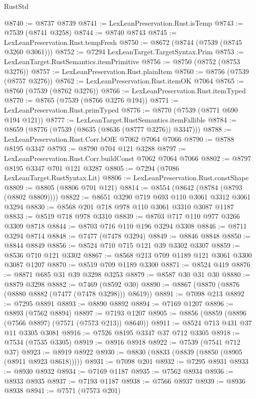 \begin{lexlean}{RustStd}
\begin{coremodule}
@8740 := @8737 @8739
@8741 := LexLeanPreservation.Rust.isTemp
@8743 := @7539 (@8741 @3258)
@8744 := @8740 @8743
@8745 := LexLeanPreservation.Rust.tempFresh
@8750 := @8672 (@8744 (@7539 (@8745 @3260 @3061)))
@8752 := @7294 LexLeanTarget.TargetSyntax.Prim
@8753 := LexLeanTarget.RustSemantics.itemPrimitive
@8756 := @8750 (@8752 (@8753 @3276))
@8757 := LexLeanPreservation.Rust.plainItem
@8760 := @8756 (@7539 (@8757 @3276))
@8762 := LexLeanPreservation.Rust.itemOK @7064
@8765 := @8760 (@7539 (@8762 @3276))
@8766 := LexLeanPreservation.Rust.itemTyped
@8770 := @8765 (@7539 (@8766 @3276 @194))
@8771 := LexLeanPreservation.Rust.primTyped
@8776 := @8770 (@7539 (@8771 @690 @194 @121))
@8777 := LexLeanTarget.RustSemantics.itemFallible
@8784 := @8659 (@8776 (@7539 (@8635 (@8636 (@8777 @3276)) @3347)))
@8788 := LexLeanPreservation.Rust.Corr.bOfE @7062 @7064 @7066
@8790 := @8788 @8195 @3347
@8793 := @8790 @704 @121 @3288
@8797 := LexLeanPreservation.Rust.Corr.buildConst @7062 @7064 @7066
@8802 := @8797 @8195 @3347 @701 @121 @3287
@8805 := @7294 (@7086 LexLeanTarget.RustSyntax.Lit)
@8806 := LexLeanPreservation.Rust.constShape
@8809 := @8805 (@8806 @701 @121)
@8814 := @8554 (@8642 (@8784 (@8793 (@8802 @8809))))
@8822 := @8651 @3290 @719 @693 @110 @3061 @3312 @3061 @3294
@8830 := @8568 @201 @718 @978 @110 @3061 @3310 @3087 @1187
@8833 := @8519 @718 @978 @3310
@8839 := @8703 @717 @110 @977 @3266 @3309 @8718
@8844 := @8703 @716 @110 @196 @3294 @3308
@8846 := @8711 @3294 @8714
@8848 := @7477 (@7478 @3294)
@8849 := @8846 @8848
@8850 := @8844 @8849
@8856 := @8524 @710 @715 @121 @39 @3302 @3307
@8859 := @8536 @710 @121 @3302
@8867 := @8568 @213 @709 @1189 @121 @3061 @3300 @3087 @1207
@8870 := @8519 @709 @1189 @3300
@8871 := @8524 @419
@8876 := @8871 @685 @31 @39 @3298 @3253
@8879 := @8587 @30 @31 @30
@8880 := @8879 @3298
@8882 := @7469 (@8592 @30)
@8890 := @8867 (@8870 (@8876 (@8880 @8882 (@7477 (@7478 @3298))) @8619))
@8891 := @7098 @213
@8892 := @7295 @8891
@8893 := @8890 @8892
@8894 := @7169 @1207
@8896 := @8893 (@7562 @8894)
@8897 := @7193 @1207
@8905 := @8856 (@8859 (@8896 (@7566 @8897) (@7571 (@7573 @213)) @8640))
@8911 := @8524 @713 @431 @37 @11 @3305 @3081
@8916 := @7526 @8195 @3347 @37 @712 @3305
@8918 := @7534 (@7535 @3305)
@8919 := @8916 @8918
@8922 := @7539 (@7541 @712 @37)
@8923 := @8919 @8922
@8930 := @8830 (@8833 (@8839 (@8850 (@8905 (@8911 @8923 @8618)))))
@8931 := @7098 @201
@8932 := @7295 @8931
@8933 := @8930 @8932
@8934 := @7169 @1187
@8935 := @7562 @8934
@8936 := @8933 @8935
@8937 := @7193 @1187
@8938 := @7566 @8937
@8939 := @8936 @8938
@8941 := @7571 (@7573 @201)

\end{coremodule}
\end{lexlean}
